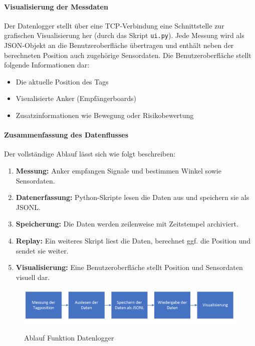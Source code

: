 \documentclass[a4paper, 12pt]{article} %
\begin{document}
\paragraph{Visualisierung der Messdaten}

Der Datenlogger stellt über eine \acf{TCP}-Verbindung eine Schnittstelle zur grafischen Visualisierung her (durch das Skript \texttt{ui.py}). 
Jede Messung wird als \ac{JSON}-Objekt an die Benutzeroberfläche übertragen und enthält neben der berechneten Position auch zugehörige Sensordaten. 
Die Benutzeroberfläche stellt folgende Informationen dar:

\begin{itemize}
    \item Die aktuelle Position des Tags
    \item Visualisierte Anker (Empfängerboards) 
    \item Zusatzinformationen wie Bewegung oder Risikobewertung
\end{itemize}

\paragraph{Zusammenfassung des Datenflusses}

Der vollständige Ablauf lässt sich wie folgt beschreiben:

\begin{enumerate}
    \item \textbf{Messung:} Anker empfangen Signale und bestimmen Winkel sowie Sensordaten.
    \item \textbf{Datenerfassung:} Python-Skripte lesen die Daten aus und speichern sie als \ac{JSONL}.
    \item \textbf{Speicherung:} Die Daten werden zeilenweise mit Zeitstempel archiviert.
    \item \textbf{Replay:} Ein weiteres Skript liest die Daten, berechnet ggf. die Position und sendet sie weiter.
    \item \textbf{Visualisierung:} Eine Benutzeroberfläche stellt Position und Sensordaten visuell dar.
\end{enumerate}

\begin{figure}[H]
    \includegraphics[width=1\linewidth]{images/Ablauf Funktion Datenlogger.png}\\[1ex]
    \centering
    \caption{Ablauf Funktion Datenlogger}
    \label{ABBILDUNG}
\end{figure}
\end{document}
